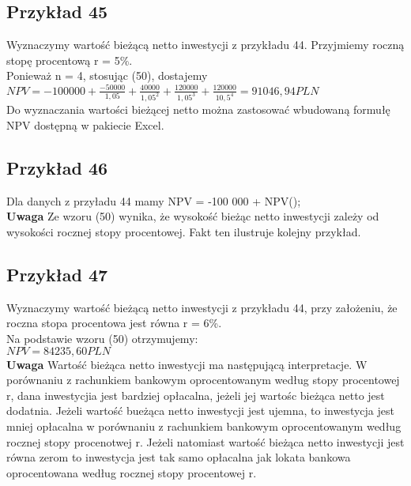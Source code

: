 \documentclass{article}
\begin{document}
\subsection{Przykład 45}

Wyznaczymy wartość bieżącą netto inwestycji z przykładu 44. Przyjmiemy roczną stopę procentową r = 5\%.\\

Ponieważ n = 4, stosując (50), dostajemy\\

$ NPV = - 100 000 + \frac{-50 000}{1,05} + \frac{40 000}{1,05^2} + \frac{120 000}{1,05^3} + \frac{120 000}{10,5^4} = 91 046,94 PLN $\\

Do wyznaczania wartości bieżącej netto można zastosować wbudowaną formułę NPV dostępną w pakiecie Excel.

\subsection{Przykład 46}

Dla danych z przyładu 44 mamy NPV = -100 000 + NPV();\\

\textbf{Uwaga} Ze wzoru (50) wynika, że wysokość bieżąc netto inwestycji zależy od wysokości rocznej stopy procentowej. Fakt ten ilustruje kolejny przykład.

\subsection{Przykład 47}

Wyznaczymy wartość bieżącą netto inwestycji z przykładu 44, przy założeniu, że roczna stopa procentowa jest równa r = 6\%.\\

Na podstawie wzoru (50) otrzymujemy:\\

$ NPV = 84 235,60 PLN $\\

\textbf{Uwaga} Wartość bieżąca netto inwestycji ma następującą interpretacje. W porównaniu z rachunkiem bankowym oprocentowanym według stopy procentowej r, dana inwestycjia jest bardziej opłacalna, jeżeli jej wartośc bieżąca netto jest dodatnia. Jeżeli wartość bueżąca netto inwestycji jest ujemna, to inwestycja jest mniej opłacalna w porównaniu z rachunkiem bankowym oprocentowanym według rocznej stopy procenotwej r. Jeżeli natomiast wartość bieżąca  netto inwestycji jest równa zerom to inwestycja jest tak samo opłacalna jak lokata bankowa oprocentowana według rocznej stopy procentowej r.\\
\end{document}
